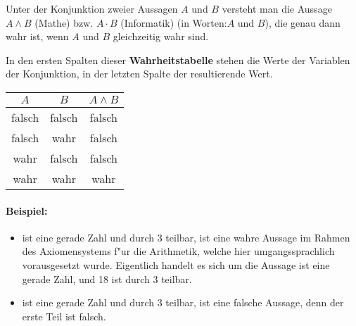 \begin{definition}[Konjunktion]
Unter der Konjunktion zweier Aussagen $A$ und $B$ versteht man die Aussage $A \land B$ (Mathe) bzw. $A \cdot B$ (Informatik) (in Worten:\glqq $A$ und $B$\grqq ), die genau dann wahr ist, wenn $A$ und $B$ gleichzeitig wahr sind.
\end{definition}
In den ersten Spalten dieser \textbf{Wahrheitstabelle} stehen die Werte der Variablen der Konjunktion, in der letzten Spalte der resultierende Wert.
\begin{center}
\begin{tabular}{c|c||c}
 $A$& $B$  &  $A \land B$  \\ 
\hline
\cellcolor{ared} falsch & \cellcolor{ared} falsch & \cellcolor{ared} falsch   \\ 
\cellcolor{ared} falsch & \cellcolor{agreen} wahr & \cellcolor{ared} falsch  \\ 
\cellcolor{agreen} wahr & \cellcolor{ared} falsch & \cellcolor{ared} falsch   \\ 
\cellcolor{agreen} wahr & \cellcolor{agreen} wahr & \cellcolor{agreen} wahr  \\ 
\hline
\end{tabular}
\end{center}

\paragraph*{Beispiel:}
\begin{itemize}
	\item {} ist eine gerade Zahl und durch 3 teilbar\grqq , ist eine wahre Aussage im Rahmen des Axiomensystems f"ur die Arithmetik, welche hier umgangssprachlich vorausgesetzt wurde. Eigentlich handelt es sich um die Aussage  ist eine gerade Zahl, und 18 ist durch 3 teilbar\grqq .
	\item {} ist eine gerade Zahl und durch 3 teilbar\grqq, ist eine falsche Aussage, denn der erste Teil ist falsch.
\end{itemize}

